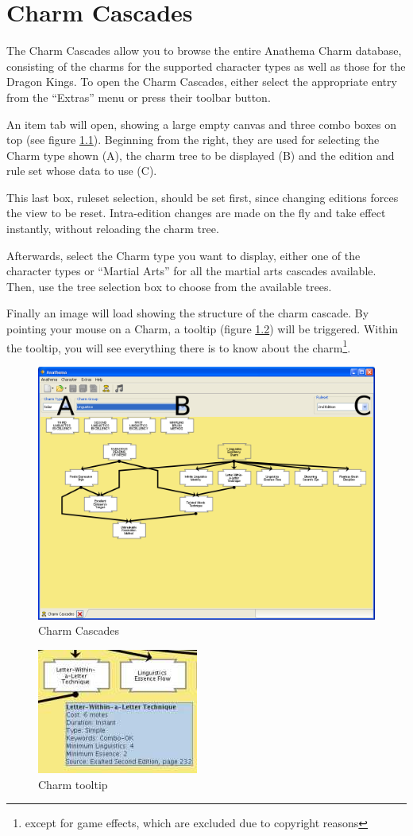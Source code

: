 \chapter{Charm Cascades}
The Charm Cascades allow you to browse the entire Anathema Charm database, consisting of the charms for the supported character types as well as those for the Dragon Kings. To open the Charm Cascades, either select the appropriate entry from the ``Extras'' menu or press their toolbar button.

An item tab will open, showing a large empty canvas and three combo boxes on top (see figure \ref{fig:CharmCascades}). Beginning from the right, they are used for selecting the Charm type shown (A), the charm tree to be displayed (B) and the edition and rule set whose data to use (C).

This last box, ruleset selection, should be set first, since changing editions forces the view to be reset. Intra-edition changes are made on the fly and take effect instantly, without reloading the charm tree.

Afterwards, select the Charm type you want to display, either one of the character types or ``Martial Arts'' for all the martial arts cascades available. Then, use the tree selection box to choose from the available trees.

Finally an image will load showing the structure of the charm cascade. By pointing your mouse on a Charm, a tooltip  (figure \ref{fig:CharmTooltip}) will be triggered. Within the tooltip, you will see everything there is to know about the charm\footnote{except for game effects, which are excluded due to copyright reasons}.

\begin{figure}[htbp]
	\centering
		\includegraphics[width=1.00\textwidth]{images/CharmCascades.png}
	\caption{Charm Cascades}
	\label{fig:CharmCascades}
\end{figure}


\begin{figure}[htbp]
	\centering
		\includegraphics{images/CharmTooltip.jpg}
	\caption{Charm tooltip}
	\label{fig:CharmTooltip}
\end{figure}